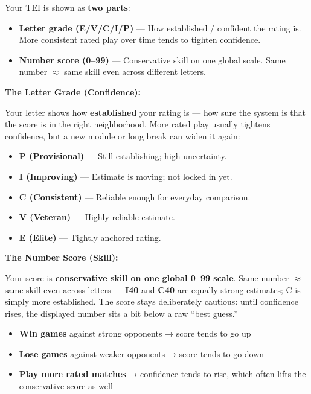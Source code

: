 \documentclass[11pt]{article}
\providecommand{\tightlist}{%
  \setlength{\itemsep}{0pt}\setlength{\parskip}{0pt}}
\begin{document}
Your TEI is shown as \textbf{two parts}:

\begin{itemize}
\tightlist
\item
  \textbf{Letter grade (E/V/C/I/P)} --- How established / confident the
  rating is. More consistent rated play over time tends to tighten
  confidence.
\item
  \textbf{Number score (0--99)} --- Conservative skill on one global
  scale. Same number $\approx$ same skill even across different
  letters.
\end{itemize}

\textbf{The Letter Grade (Confidence):}

Your letter shows how \textbf{established} your rating is --- how sure the
system is that the score is in the right neighborhood. More rated play
usually tightens confidence, but a new module or long break can widen it
again:

\begin{itemize}
\tightlist
\item
  \textbf{P (Provisional)} --- Still establishing; high uncertainty.
\item
  \textbf{I (Improving)} --- Estimate is moving; not locked in yet.
\item
  \textbf{C (Consistent)} --- Reliable enough for everyday comparison.
\item
  \textbf{V (Veteran)} --- Highly reliable estimate.
\item
  \textbf{E (Elite)} --- Tightly anchored rating.
\end{itemize}

\textbf{The Number Score (Skill):}

Your score is \textbf{conservative skill on one global 0--99 scale}. Same
number $\approx$ same skill even across letters --- \textbf{I40} and
\textbf{C40} are equally strong estimates; C is simply more established.
The score stays deliberately cautious: until confidence rises, the
displayed number sits a bit below a raw ``best guess.''

\begin{itemize}
\tightlist
\item
  \textbf{Win games} against strong opponents → score tends to go up
\item
  \textbf{Lose games} against weaker opponents → score tends to go down
\item
  \textbf{Play more rated matches} → confidence tends to rise, which
  often lifts the conservative score as well
\end{itemize}
\end{document}
